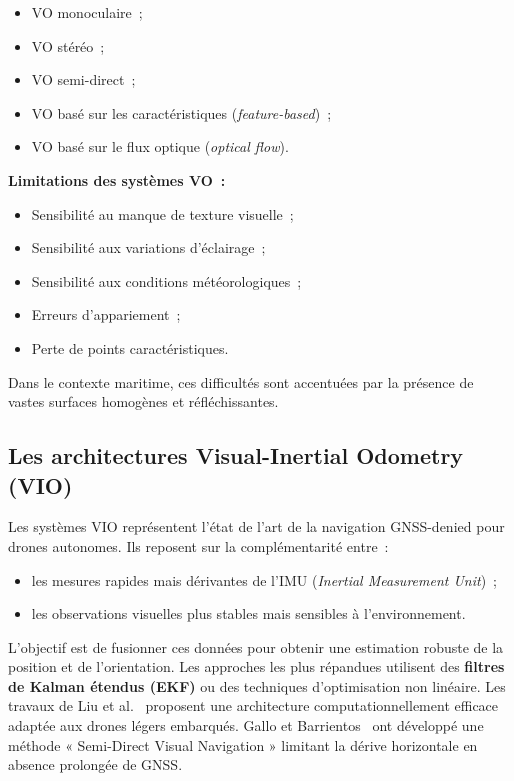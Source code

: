 \documentclass[12pt, a4paper, twoside, openright]{report}
\begin{document}
\begin{itemize}
    \item VO monoculaire~;
    \item VO stéréo~;
    \item VO semi-direct~;
    \item VO basé sur les caractéristiques (\textit{feature-based})~;
    \item VO basé sur le flux optique (\textit{optical flow}).
\end{itemize}

\textbf{Limitations des systèmes VO~:}
\begin{itemize}
    \item Sensibilité au manque de texture visuelle~;
    \item Sensibilité aux variations d'éclairage~;
    \item Sensibilité aux conditions météorologiques~;
    \item Erreurs d'appariement~;
    \item Perte de points caractéristiques.
\end{itemize}

Dans le contexte maritime, ces difficultés sont accentuées par la présence de vastes surfaces homogènes et réfléchissantes.

\subsection{Les architectures Visual-Inertial Odometry (VIO)}

Les systèmes VIO représentent l'état de l'art de la navigation GNSS-denied pour drones autonomes. Ils reposent sur la complémentarité entre~:

\begin{itemize}
    \item les mesures rapides mais dérivantes de l'IMU (\textit{Inertial Measurement Unit})~;
    \item les observations visuelles plus stables mais sensibles à l'environnement.
\end{itemize}

L'objectif est de fusionner ces données pour obtenir une estimation robuste de la position et de l'orientation. Les approches les plus répandues utilisent des \textbf{filtres de Kalman étendus (EKF)} ou des techniques d'optimisation non linéaire. Les travaux de Liu et al.~\cite{liu2020visual} proposent une architecture computationnellement efficace adaptée aux drones légers embarqués. Gallo et Barrientos~\cite{gallo2023semi} ont développé une méthode « Semi-Direct Visual Navigation » limitant la dérive horizontale en absence prolongée de GNSS.
\end{document}
